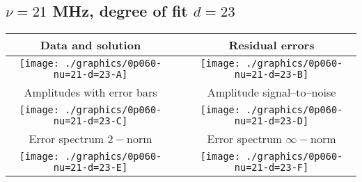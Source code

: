 

% 

\clearpage{}
\break{}

\subsection{$\nu = 21$ MHz, degree of fit $d = 23$}

\begin{table}[h]
    \begin{center}
        \begin{tabular}{ccc}
            Data and solution & \quad & Residual errors \\\hline
            \texttt{[image: ./graphics/0p060-nu=21-d=23-A]} &&
            \texttt{[image: ./graphics/0p060-nu=21-d=23-B]} \\[15pt]
            Amplitudes with error bars && Amplitude signal--to--noise \\\hline
            \texttt{[image: ./graphics/0p060-nu=21-d=23-C]} &&
            \texttt{[image: ./graphics/0p060-nu=21-d=23-D]} \\[15pt]
            Error spectrum $2-$norm && Error spectrum $\infty-$norm \\\hline
            \texttt{[image: ./graphics/0p060-nu=21-d=23-E]} &&
            \texttt{[image: ./graphics/0p060-nu=21-d=23-F]} \\[15pt]
        \end{tabular}
    \end{center}
\label{fig:elev=60, nu=21}
\end{table}



\endinput

